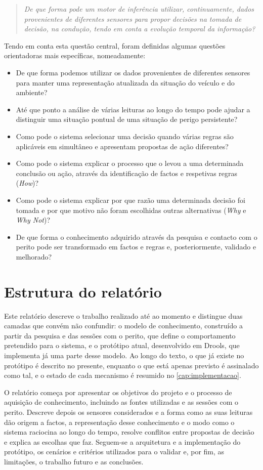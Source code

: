 \begin{quote}
  \itshape De que forma pode um motor de inferência utilizar, continuamente,
  dados provenientes de diferentes sensores para propor decisões na tomada de
  decisão, na condução, tendo em conta a evolução temporal da informação?
\end{quote}

Tendo em conta esta questão central, foram definidas algumas questões
orientadoras mais específicas, nomeadamente:
\begin{itemize}
  \item De que forma podemos utilizar os dados provenientes de diferentes
    sensores para manter uma representação atualizada da situação do veículo
    e do ambiente?
  \item Até que ponto a análise de várias leituras ao longo do tempo pode
    ajudar a distinguir uma situação pontual de uma situação de perigo
    persistente?
  \item Como pode o sistema selecionar uma decisão quando várias regras são
    aplicáveis em simultâneo e apresentam propostas de ação diferentes?
  \item Como pode o sistema explicar o processo que o levou a uma determinada
    conclusão ou ação, através da identificação de factos e respetivas regras
    (\emph{How})?
  \item Como pode o sistema explicar por que razão uma determinada decisão foi
    tomada e por que motivo não foram escolhidas outras alternativas
    (\emph{Why} e \emph{Why Not})?
  \item De que forma o conhecimento adquirido através da pesquisa e contacto
    com o perito pode ser transformado em factos e regras e, posteriormente,
    validado e melhorado?
\end{itemize}

\section{Estrutura do relatório}
\label{sec:estrutura}

Este relatório descreve o trabalho realizado até ao momento e distingue duas
camadas que convém não confundir: o modelo de conhecimento, construído a
partir da pesquisa e das sessões com o perito, que define o comportamento
pretendido para o sistema, e o protótipo atual, desenvolvido em Drools, que
implementa já uma parte desse modelo. Ao longo do texto, o que já existe no
protótipo é descrito no presente, enquanto o que está apenas previsto é
assinalado como tal, e o estado de cada mecanismo é resumido no
\cref{cap:implementacao}.

O relatório começa por apresentar os objetivos do projeto e o processo de
aquisição de conhecimento, incluindo as fontes utilizadas e as sessões com o
perito. Descreve depois os sensores considerados e a forma como as suas
leituras dão origem a factos, a representação desse conhecimento e o modo
como o sistema raciocina ao longo do tempo, resolve conflitos entre propostas
de decisão e explica as escolhas que faz. Seguem-se a arquitetura e a
implementação do protótipo, os cenários e critérios utilizados para o
validar e, por fim, as limitações, o trabalho futuro e as conclusões.
